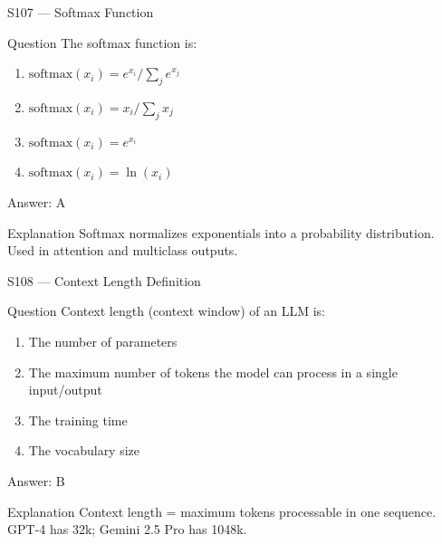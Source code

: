 \documentclass[aspectratio=169,8pt]{beamer}
\begin{document}
	\begin{frame}{S107 --- Softmax Function}
		\begin{block}{Question}
			The softmax function is:
			\begin{enumerate}
				\item $\text{softmax}(x_i) = e^{x_i}/\sum_j e^{x_j}$
				\item $\text{softmax}(x_i) = x_i/\sum_j x_j$
				\item $\text{softmax}(x_i) = e^{x_i}$
				\item $\text{softmax}(x_i) = \ln(x_i)$
			\end{enumerate}
		\end{block}
		\begin{exampleblock}{Answer: A}\end{exampleblock}
		\begin{block}{Explanation}
			Softmax normalizes exponentials into a probability distribution. Used in attention and multiclass outputs.
		\end{block}
	\end{frame}
	
	\begin{frame}{S108 --- Context Length Definition}
		\begin{block}{Question}
			Context length (context window) of an LLM is:
			\begin{enumerate}
				\item The number of parameters
				\item The maximum number of tokens the model can process in a single input/output
				\item The training time
				\item The vocabulary size
			\end{enumerate}
		\end{block}
		\begin{exampleblock}{Answer: B}\end{exampleblock}
		\begin{block}{Explanation}
			Context length = maximum tokens processable in one sequence. GPT-4 has 32k; Gemini 2.5 Pro has 1048k.
		\end{block}
	\end{frame}
	
\end{document}
